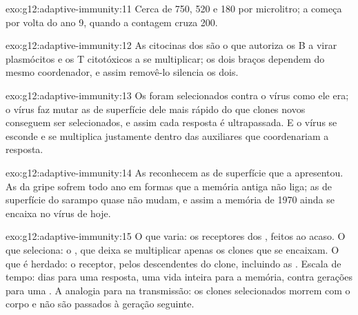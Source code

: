 \begin{solution}{exo:g12:adaptive-immunity:11}
Cerca de 750, 520 e 180 por microlitro; a  começa por volta do ano
9, quando a contagem cruza 200.
\end{solution}

\begin{solution}{exo:g12:adaptive-immunity:12}
As citocinas dos  são o que autoriza os
 B a virar plasmócitos e os  T citotóxicos a se
multiplicar; os dois braços dependem do mesmo coordenador, e assim
removê-lo silencia os dois.
\end{solution}

\begin{solution}{exo:g12:adaptive-immunity:13}
Os  foram selecionados contra o vírus como ele era; o vírus
faz mutar as  de superfície dele mais rápido do que clones
novos conseguem ser selecionados, e assim cada resposta é ultrapassada.
E o vírus se esconde e se multiplica justamente dentro das 
auxiliares que coordenariam a resposta.
\end{solution}

\begin{solution}{exo:g12:adaptive-immunity:14}
As  reconhecem as  de superfície que a
 apresentou. As da gripe sofrem  todo ano em formas que a
memória antiga não liga; as  de superfície do sarampo quase
não mudam, e assim a memória de 1970 ainda se encaixa no vírus de hoje.
\end{solution}

\begin{solution}{exo:g12:adaptive-immunity:15}
O que varia: os receptores dos , feitos ao acaso. O que
seleciona: o , que deixa se multiplicar apenas os clones que se
encaixam. O que é herdado: o receptor, pelos descendentes do clone,
incluindo as . Escala de tempo: dias para uma
resposta, uma vida inteira para a memória, contra gerações para uma
. A analogia para na transmissão: os clones selecionados
morrem com o corpo e não são passados à geração seguinte.
\end{solution}

